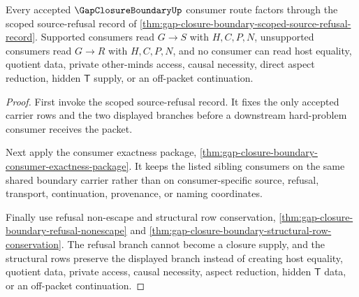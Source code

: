 \begin{theorem}
\label{thm:gap-closure-boundary-consumer-scope-nonescape}
Every accepted $\GapClosureBoundaryUp$ consumer route factors through the scoped source-refusal record of \autoref{thm:gap-closure-boundary-scoped-source-refusal-record}. Supported consumers read $G \longrightarrow S$ with $H,C,P,N$, unsupported consumers read $G \longrightarrow R$ with $H,C,P,N$, and no consumer can read host equality, quotient data, private other-minds access, causal necessity, direct aspect reduction, hidden $\mathsf{T}$ supply, or an off-packet continuation.
\end{theorem}
\begin{proof}
First invoke the scoped source-refusal record. It fixes the only accepted carrier rows and the two displayed branches before a downstream hard-problem consumer receives the packet.

Next apply the consumer exactness package, \autoref{thm:gap-closure-boundary-consumer-exactness-package}. It keeps the listed sibling consumers on the same shared boundary carrier rather than on consumer-specific source, refusal, transport, continuation, provenance, or naming coordinates.

Finally use refusal non-escape and structural row conservation, \autoref{thm:gap-closure-boundary-refusal-nonescape} and \autoref{thm:gap-closure-boundary-structural-row-conservation}. The refusal branch cannot become a closure supply, and the structural rows preserve the displayed branch instead of creating host equality, quotient data, private access, causal necessity, aspect reduction, hidden $\mathsf{T}$ data, or an off-packet continuation.
\end{proof}

